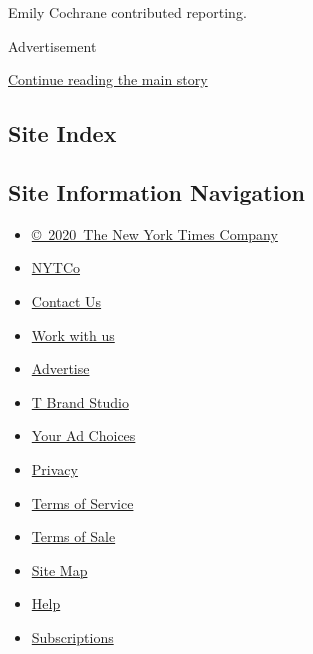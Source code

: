 Emily Cochrane contributed reporting.

Advertisement

\protect\hyperlink{after-bottom}{Continue reading the main story}

\hypertarget{site-index}{%
\subsection{Site Index}\label{site-index}}

\hypertarget{site-information-navigation}{%
\subsection{Site Information
Navigation}\label{site-information-navigation}}

\begin{itemize}
\tightlist
\item
  \href{https://help.nytimes3xbfgragh.onion/hc/en-us/articles/115014792127-Copyright-notice}{©~2020~The
  New York Times Company}
\end{itemize}

\begin{itemize}
\tightlist
\item
  \href{https://www.nytco.com/}{NYTCo}
\item
  \href{https://help.nytimes3xbfgragh.onion/hc/en-us/articles/115015385887-Contact-Us}{Contact
  Us}
\item
  \href{https://www.nytco.com/careers/}{Work with us}
\item
  \href{https://nytmediakit.com/}{Advertise}
\item
  \href{http://www.tbrandstudio.com/}{T Brand Studio}
\item
  \href{https://www.nytimes3xbfgragh.onion/privacy/cookie-policy\#how-do-i-manage-trackers}{Your
  Ad Choices}
\item
  \href{https://www.nytimes3xbfgragh.onion/privacy}{Privacy}
\item
  \href{https://help.nytimes3xbfgragh.onion/hc/en-us/articles/115014893428-Terms-of-service}{Terms
  of Service}
\item
  \href{https://help.nytimes3xbfgragh.onion/hc/en-us/articles/115014893968-Terms-of-sale}{Terms
  of Sale}
\item
  \href{https://spiderbites.nytimes3xbfgragh.onion}{Site Map}
\item
  \href{https://help.nytimes3xbfgragh.onion/hc/en-us}{Help}
\item
  \href{https://www.nytimes3xbfgragh.onion/subscription?campaignId=37WXW}{Subscriptions}
\end{itemize}
